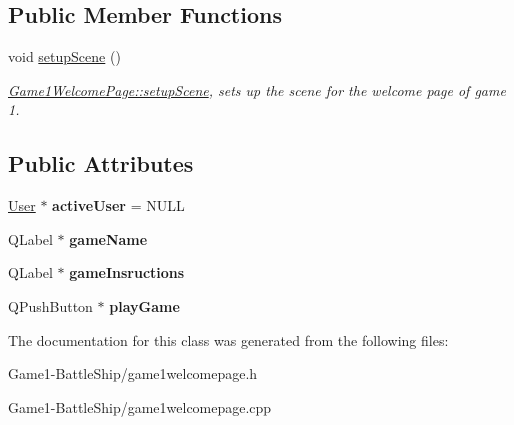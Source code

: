 \subsection*{Public Member Functions}
\begin{DoxyCompactItemize}
\item 
\mbox{\label{classGame1WelcomePage_adb52f15e9d1da8800d544924d8166bf2}} 
void \hyperlink{classGame1WelcomePage_adb52f15e9d1da8800d544924d8166bf2}{setup\+Scene} ()
\begin{DoxyCompactList}\small\item\em \hyperlink{classGame1WelcomePage_adb52f15e9d1da8800d544924d8166bf2}{Game1\+Welcome\+Page\+::setup\+Scene}, sets up the scene for the welcome page of game 1. \end{DoxyCompactList}\end{DoxyCompactItemize}
\subsection*{Public Attributes}
\begin{DoxyCompactItemize}
\item 
\mbox{\label{classGame1WelcomePage_af22e39d821428cef70ea1f7f14bbf07e}} 
\hyperlink{classUser}{User} $\ast$ {\bfseries active\+User} = N\+U\+LL
\item 
\mbox{\label{classGame1WelcomePage_ad5a2341f2f1f8cbcd1e177c8324f8ef0}} 
Q\+Label $\ast$ {\bfseries game\+Name}
\item 
\mbox{\label{classGame1WelcomePage_adf4925039198d5fa91928de80553b1fd}} 
Q\+Label $\ast$ {\bfseries game\+Insructions}
\item 
\mbox{\label{classGame1WelcomePage_a3ccd25fb9e2ca9ca91a18c0bbb31a860}} 
Q\+Push\+Button $\ast$ {\bfseries play\+Game}
\end{DoxyCompactItemize}


The documentation for this class was generated from the following files\+:\begin{DoxyCompactItemize}
\item 
Game1-\/\+Battle\+Ship/game1welcomepage.\+h\item 
Game1-\/\+Battle\+Ship/game1welcomepage.\+cpp\end{DoxyCompactItemize}

